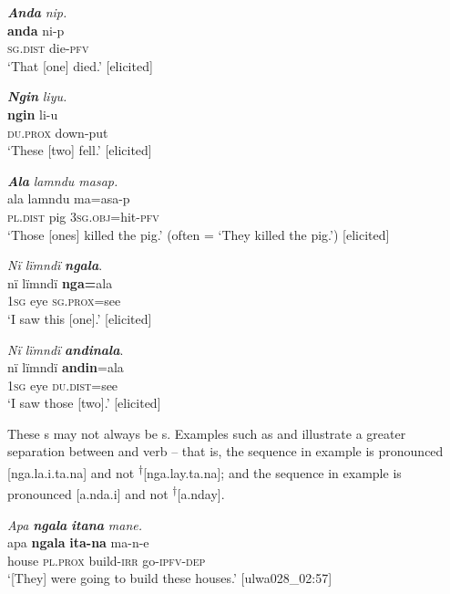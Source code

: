 \ea%
    \label{ex:det:138}
          \textbf{\textit{Anda}} \textit{nip.}\\
\gll    \textbf{anda}    ni-p\\
    \textsc{sg.dist}  die-\textsc{pfv}\\
\glt `That [one] died.’ [elicited]
\z

\ea%
    \label{ex:det:139}
          \textbf{\textit{Ngin}} \textit{liyu.}\\
\gll    \textbf{ngin}    li-u\\
    \textsc{du.prox}  down-put\\
\glt `These [two] fell.’ [elicited]
\z

\ea%
    \label{ex:det:140}
          \textbf{\textit{Ala}} \textit{lamndu masap.}\\
\gll    ala      lamndu  ma=asa-p\\
    \textsc{pl.dist}  pig      3\textsc{sg.obj}=hit-\textsc{pfv}\\
\glt `Those [ones] killed the pig.’ (often = ‘They killed the pig.’) [elicited]
\z

\ea%
    \label{ex:det:141}
          \textit{Nï lïmndï} \textbf{\textit{ngala}}.\\
\gll nï    lïmndï  \textbf{nga=}ala\\
    \textsc{1sg}  eye    \textsc{sg.prox}=see\\
\glt `I saw this [one].’ [elicited]
\z

\ea%
    \label{ex:det:142}
          \textit{Nï lïmndï} \textbf{\textit{andinala}}.\\
\gll nï    lïmndï  \textbf{andin}=ala\\
    \textsc{1sg}  eye    \textsc{du.dist}=see\\
\glt `I saw those [two].’ [elicited]
\z

These   s may not always be s. Examples such as  and  illustrate a greater  separation between  and verb -- that is, the sequence in example  is pronounced [nga.la.i.ta.na] and not \textsuperscript{†}[nga.lay.ta.na]; and the sequence in example  is pronounced [a.nda.i] and not \textsuperscript{†}[a.nday].

\ea%
    \label{ex:det:143}
          \textit{Apa} \textbf{\textit{ngala}} \textbf{\textit{itana}} \textit{mane.}\\
\gll    apa    \textbf{ngala}    \textbf{ita-na}    ma-n-e\\
    house  \textsc{pl.prox}  build-\textsc{irr}  go-\textsc{ipfv-dep}\\
\glt `[They] were going to build these houses.’ [ulwa028\_02:57]
\z

